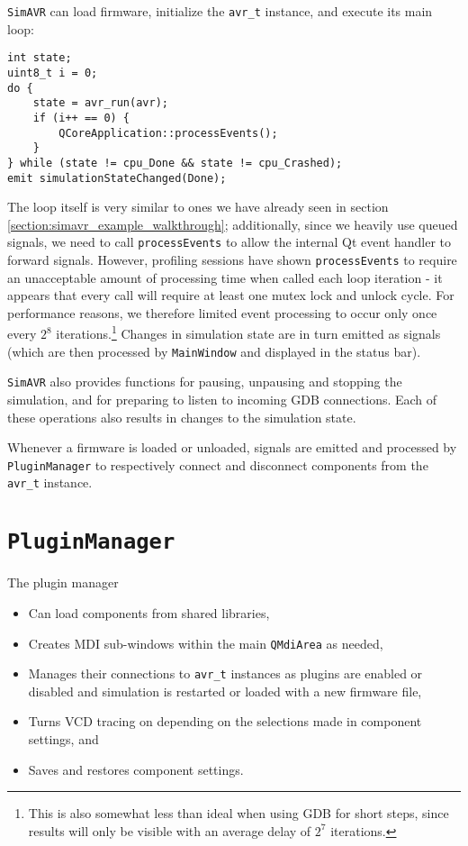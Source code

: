 \lstinline|SimAVR| can load firmware, initialize the \lstinline|avr_t| instance,
and execute its main loop:

\begin{lstlisting}
int state;
uint8_t i = 0;
do {
    state = avr_run(avr);
    if (i++ == 0) {
        QCoreApplication::processEvents();
    }
} while (state != cpu_Done && state != cpu_Crashed);
emit simulationStateChanged(Done);
\end{lstlisting}

The loop itself is very similar to ones we have already seen in section
\ref{section:simavr_example_walkthrough}; additionally, since we heavily use
queued signals, we need to call \lstinline|processEvents| to allow the internal
Qt event handler to forward signals. However, profiling sessions have shown
\lstinline|processEvents| to require an unacceptable amount of processing time
when called each loop iteration - it appears that every call will require at least
one mutex lock and unlock cycle. For performance reasons, we therefore limited
event processing to occur only once every $2^8$ iterations.\footnote{
%
This is also somewhat less than ideal when using \ac{GDB} for short steps, since
results will only be visible with an average delay of $2^7$ iterations.
%
}
Changes in simulation state are in turn
emitted as signals (which are then processed by \lstinline|MainWindow| and
displayed in the status bar).

\lstinline|SimAVR| also provides functions for pausing, unpausing and stopping the
simulation, and for preparing \simavr to listen to incoming \ac{GDB} connections.
Each of these operations also results in changes to the simulation state.

Whenever a firmware is loaded or unloaded, signals are emitted and processed
by \lstinline|PluginManager| to respectively connect and disconnect components
from the \lstinline|avr_t| instance.

\section{\lstinline|PluginManager|}

The plugin manager

\begin{itemize}
\item Can load components from shared libraries,
\item Creates \ac{MDI} sub-windows within the main \lstinline|QMdiArea| as needed,
\item Manages their connections to \lstinline|avr_t| instances as plugins are
      enabled or disabled and simulation is restarted or loaded with a new firmware
      file,
\item Turns \ac{VCD} tracing on depending on the selections made in component
      settings, and
\item Saves and restores component settings.
\end{itemize}

